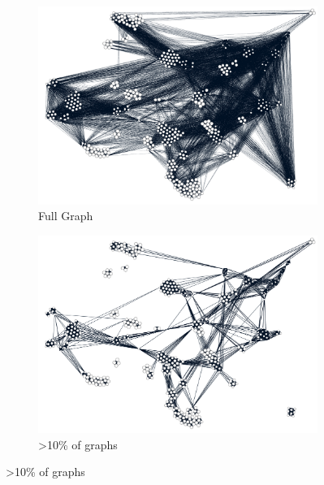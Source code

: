 \begin{figure}[H]
\begin{subfigure}[t]{.5\textwidth}
  \centering
  \includegraphics[width=\textwidth]{fig/c1.png}
  \caption{Full Graph}
\end{subfigure}%
\begin{subfigure}[t]{.5\textwidth}
  \centering
  \includegraphics[width=\textwidth]{fig/c2.png}
  \caption{>10\% of graphs}
\end{subfigure}%


\end{figure}
